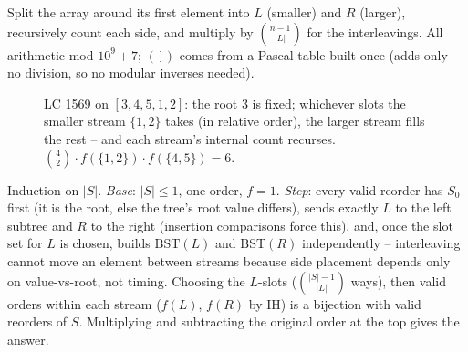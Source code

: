 Split the array around its first element into $L$ (smaller) and $R$ (larger),
recursively count each side, and multiply by $\binom{n-1}{|L|}$ for the interleavings.
All arithmetic mod $10^9+7$; $\binom{\cdot}{\cdot}$ comes from a Pascal table built
once (adds only -- no division, so no modular inverses needed).
\begin{figure}[H]
\centering
{}
\caption{LC 1569 on $[3,4,5,1,2]$: the root $3$ is fixed; whichever slots the smaller
stream $\{1,2\}$ takes (in relative order), the larger stream fills the rest -- and each
stream's internal count recurses. $\binom{4}{2}\cdot f(\{1,2\})\cdot f(\{4,5\}) = 6$.}\label{fig:c01-reorder-split}
\end{figure}

\begin{proofbox}
Induction on $|S|$. \emph{Base}: $|S|\le 1$, one order, $f=1$. \emph{Step}: every valid
reorder has $S_0$ first (it is the root, else the tree's root value differs), sends
exactly $L$ to the left subtree and $R$ to the right (insertion comparisons force this),
and, once the slot set for $L$ is chosen, builds $\text{BST}(L)$ and $\text{BST}(R)$
independently -- interleaving cannot move an element between streams because side
placement depends only on value-vs-root, not timing. Choosing the $L$-slots
($\binom{|S|-1}{|L|}$ ways), then valid orders within each stream
($f(L)$, $f(R)$ by IH) is a bijection with valid reorders of $S$. Multiplying and
subtracting the original order at the top gives the answer.
\end{proofbox}

